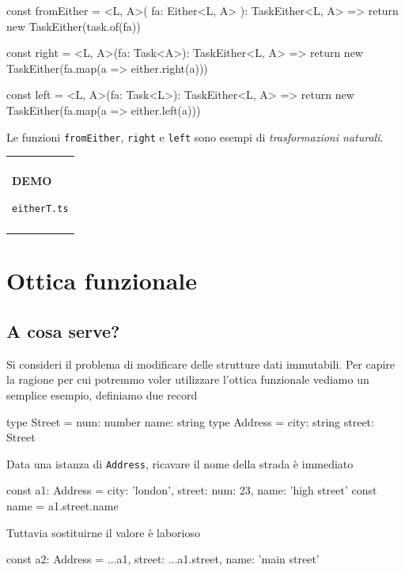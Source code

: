 \documentclass[12pt]{article}
\theoremstyle{definition}
\newenvironment{demo}
    {\begin{center}
    \begin{tabular}{|p{0.9\textwidth}|}
    \hline\\
    }
    {
    \\\\\hline
    \end{tabular}
    \end{center}
    }
\newenvironment{code}
  {\vspace{0.5cm} \VerbatimEnvironment\begin{typescriptcode}}
  {\end{typescriptcode} \vspace{0.2cm}}
\begin{document}
\begin{code}
const fromEither = <L, A>(
  fa: Either<L, A>
): TaskEither<L, A> => {
  return new TaskEither(task.of(fa))
}

const right = <L, A>(fa: Task<A>): TaskEither<L, A> => {
  return new TaskEither(fa.map(a => either.right(a)))
}

const left = <L, A>(fa: Task<L>): TaskEither<L, A> => {
  return new TaskEither(fa.map(a => either.left(a)))
}
\end{code}

Le funzioni \texttt{fromEither}, \texttt{right} e \texttt{left} sono esempi di \emph{trasformazioni naturali}.

\begin{demo}
\begin{center}
\textbf{DEMO}

\texttt{eitherT.ts}
\end{center}
\end{demo}

\newpage

\section{Ottica funzionale}

\subsection{A cosa serve?}

Si consideri il problema di modificare delle strutture dati immutabili.
Per capire la ragione per cui potremmo voler utilizzare l'ottica funzionale vediamo un semplice esempio, definiamo due record

\begin{code}
type Street = {
  num: number
  name: string
}
type Address = {
  city: string
  street: Street
}
\end{code}

Data una istanza di \texttt{Address}, ricavare il nome della strada è immediato

\begin{code}
const a1: Address = {
  city: 'london',
  street: { num: 23, name: 'high street' }
}
const name = a1.street.name
\end{code}

Tuttavia sostituirne il valore è laborioso

\begin{code}
const a2: Address = {
  ...a1,
  street: {
    ...a1.street,
    name: 'main street'
  }
}
\end{code}
\end{document}
